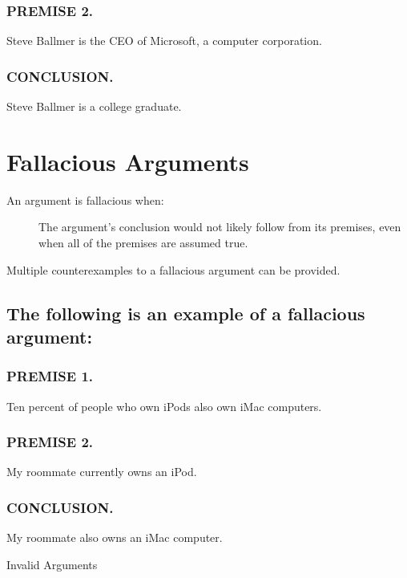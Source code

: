 \documentclass{article}
\begin{document}
    \subsubsection{PREMISE 2.}
Steve Ballmer is the CEO of Microsoft, a computer corporation.

    \subsubsection{CONCLUSION.}
Steve Ballmer is a college graduate.


    \section{Fallacious Arguments}

    \begin{description}
    \item [An argument is fallacious when:] The argument’s conclusion would not likely follow from its premises, even when all of the premises are assumed true.
    \end{description}

Multiple counterexamples to a fallacious argument can be provided.

      \subsection{The following is an example of a fallacious argument:}

      \subsubsection{PREMISE 1.}
Ten percent of people who own iPods also own iMac computers.

      \subsubsection{PREMISE 2.}
My roommate currently owns an iPod.

      \subsubsection{CONCLUSION.}
My roommate also owns an iMac computer.

Invalid Arguments
\end{document}
